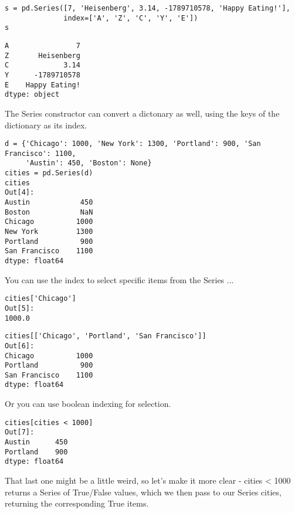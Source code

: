 \documentclass[main.tex]{subfiles}
\begin{document}
\begin{framed}
\begin{verbatim}
s = pd.Series([7, 'Heisenberg', 3.14, -1789710578, 'Happy Eating!'],
              index=['A', 'Z', 'C', 'Y', 'E'])
s
\end{verbatim}
\end{framed}
\begin{verbatim}
A                7
Z       Heisenberg
C             3.14
Y      -1789710578
E    Happy Eating!
dtype: object
\end{verbatim}

The Series constructor can convert a dictonary as well, using the keys of the dictionary as its index.

\begin{framed}
\begin{verbatim}
d = {'Chicago': 1000, 'New York': 1300, 'Portland': 900, 'San Francisco': 1100,
     'Austin': 450, 'Boston': None}
cities = pd.Series(d)
cities
Out[4]:
Austin            450
Boston            NaN
Chicago          1000
New York         1300
Portland          900
San Francisco    1100
dtype: float64
\end{verbatim}
\end{framed}
You can use the index to select specific items from the Series ...

\begin{framed}
\begin{verbatim}
cities['Chicago']
Out[5]:
1000.0
\end{verbatim}
\end{framed}

\begin{framed}
\begin{verbatim}
cities[['Chicago', 'Portland', 'San Francisco']]
Out[6]:
Chicago          1000
Portland          900
San Francisco    1100
dtype: float64
\end{verbatim}
\end{framed}
Or you can use boolean indexing for selection.

\begin{framed}
\begin{verbatim}
cities[cities < 1000]
Out[7]:
Austin      450
Portland    900
dtype: float64
\end{verbatim}
\end{framed}
That last one might be a little weird, so let's make it more clear - cities < 1000 returns a Series of True/False values, which we then pass to our Series cities, returning the corresponding True items.
\end{document}

